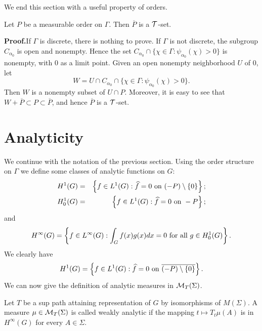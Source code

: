 \documentclass[12pt,leqno]{article}
\def\cMT{{\cal M}_T(\Sigma)}
\begin{document}
We end this section with a useful property of orders.

\begin{prop}
Let $P$ be a measurable order on $\Gamma$.
Then
$\overline{P}$ is a 
${\cal T}$-set.
\label{ptset}
\end{prop}

\noindent
{\bf Proof.}\quad If $\Gamma$ is discrete, there is nothing to prove.  If $\Gamma$ is not discrete, the subgroup
$C_{\alpha_0}$ is open and nonempty.  Hence the set
$  C_{\alpha_0}\cap \{\chi\in \Gamma:\psi_{\alpha_0}
(\chi)>0\}$ is nonempty, with $0$ as a limit
point.  Given an open nonempty neighborhood $U$ of $0$,
let 
$$W=U\cap C_{\alpha_0}\cap \{\chi\in \Gamma:\psi_{\alpha_0}
(\chi)>0\}.$$ 
Then $W$ is a nonempty subset of $U\cap P$.
Moreover, it is easy to see that 
$W+\overline{P}\subset P\subset \overline{P}$,
and hence 
$\overline{P}$ is a 
${\cal T}$-set.







\section{Analyticity}

We continue with the notation of the previous section.
Using the order structure on $\Gamma$ we define
some classes of analytic functions on $G$:
\begin{eqnarray}
H^1(G)&=&\left\{
f\in L^1(G):  \widehat{f}=0\ {\rm on}\ (-P)\setminus\{0\}
\right\};
\label{h1g}\\
H^1_0(G)&=&\left\{
f\in L^1(G):  \widehat{f}=0\ {\rm on}\ -P
\right\};\label{h10g}
\end{eqnarray}
and
\begin{equation}
H^\infty(G)=\left\{
f\in L^\infty(G):  \int_G f(x)g(x)dx=0 \ {\rm for\ all}\ g\in H^1_0(G)
\right\}.
\label{hinfg}
\end{equation}
We clearly have
$$
H^1(G)=\left\{
f\in L^1(G):  \widehat{f}=0\ {\rm on}\ \overline{(-P)\setminus\{0\}}
\right\}.$$
We can now give the definition of analytic measures in 
$\cMT$.

\begin{defin}
Let $T$ be a sup path attaining representation
of $G$ by isomorphisms of $M(\Sigma)$.  
A measure $\mu\in \cMT$ is 
called weakly analytic if the mapping $t\mapsto T_t\mu(A)$ 
is in $H^\infty(G)$ for every $A\in\Sigma$.
\end{defin}
\end{document}
